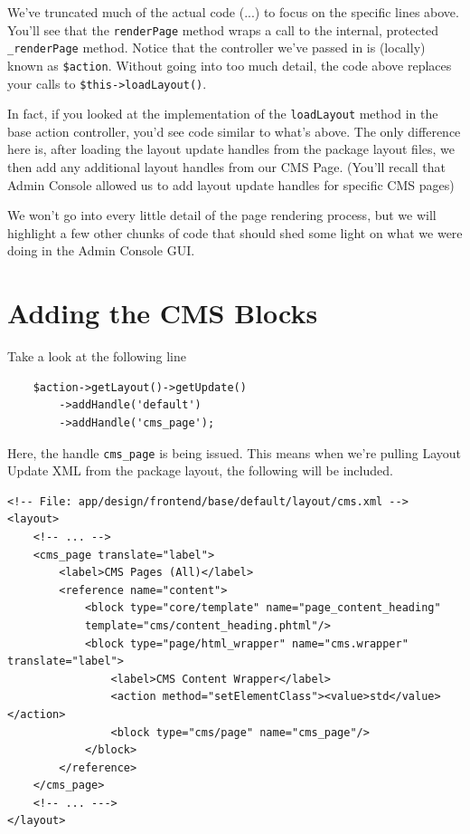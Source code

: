 \documentclass[oneside]{book}
\begin{document}
We've truncated much of the actual code (...) to focus on the specific lines above.  You'll see that the \footnotesize\texttt{renderPage} \normalsize  method wraps a call to the internal, protected \footnotesize\texttt{\_renderPage} \normalsize  method.  Notice that the controller we've passed in is (locally) known as \footnotesize\texttt{\$action}\normalsize.  Without going into too much detail, the code above replaces your calls to \footnotesize\texttt{\$this-\textgreater loadLayout()}\normalsize.

In fact, if you looked at the implementation of the \footnotesize\texttt{loadLayout} \normalsize  method in the base action controller, you'd see code similar to what's above.  The only difference here is, after loading the layout update handles from the package layout files, we then add any additional layout handles from our CMS Page. (You'll recall that Admin Console allowed us to add layout update handles for specific CMS pages)

We won't go into every little detail of the page rendering process, but we will highlight a few other chunks of code that should shed some light on what we were doing in the Admin Console GUI.

\section{Adding the CMS Blocks}

Take a look at the following line

\begin{lstlisting}
    $action->getLayout()->getUpdate()
        ->addHandle('default')
        ->addHandle('cms_page');

\end{lstlisting}


Here, the handle \footnotesize\texttt{cms\_page} \normalsize  is being issued.  This means when we're pulling Layout Update XML from the package layout, the following will be included.

\begin{lstlisting}
<!-- File: app/design/frontend/base/default/layout/cms.xml -->
<layout>
    <!-- ... -->
    <cms_page translate="label">
        <label>CMS Pages (All)</label>
        <reference name="content">
            <block type="core/template" name="page_content_heading"
            template="cms/content_heading.phtml"/>
            <block type="page/html_wrapper" name="cms.wrapper" translate="label">
                <label>CMS Content Wrapper</label>
                <action method="setElementClass"><value>std</value></action>
                <block type="cms/page" name="cms_page"/>
            </block>
        </reference>
    </cms_page>
    <!-- ... --->
</layout>

\end{lstlisting}
\end{document}
